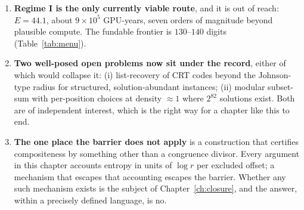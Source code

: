\begin{enumerate}
\item \textbf{Regime I is the only currently viable route}, and it is out of
reach: $E=44.1$, about $9\times10^{5}$ GPU-years, seven orders of magnitude
beyond plausible compute. The fundable frontier is $130$--$140$ digits
(Table~\ref{tab:menu}).

\item \textbf{Two well-posed open problems now sit under the record}, either of
which would collapse it: (i) list-recovery of CRT codes beyond the Johnson-type
radius for structured, solution-abundant instances; (ii) modular subset-sum with
per-position choices at density $\approx1$ where $2^{82}$ solutions exist. Both
are of independent interest, which is the right way for a chapter like this to
end.

\item \textbf{The one place the barrier does not apply} is a construction that
certifies compositeness by something other than a congruence divisor. Every
argument in this chapter accounts entropy in units of $\log r$ per excluded
offset; a mechanism that escapes that accounting escapes the barrier. Whether
any such mechanism exists is the subject of Chapter~\ref{ch:closure}, and the
answer, within a precisely defined language, is no.
\end{enumerate}
